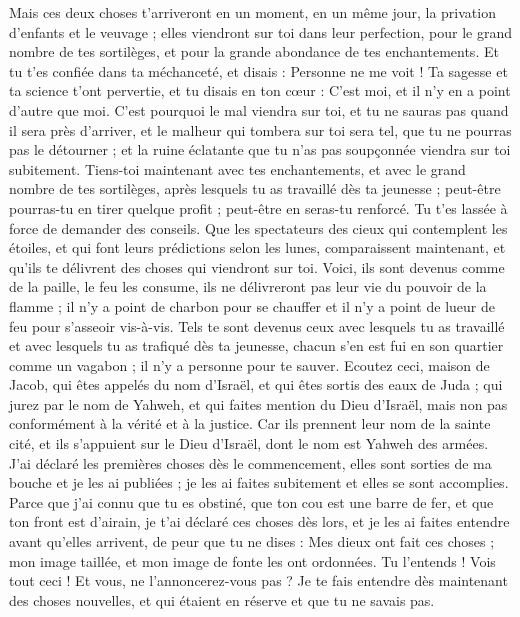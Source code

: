 \begin{multicols}{2}
Mais ces deux choses t'arriveront en un moment, en un même jour, la privation d'enfants et le veuvage ; elles viendront sur toi dans leur perfection, pour le  grand nombre de tes sortilèges, et pour la grande abondance de tes enchantements.
Et tu t'es confiée dans ta méchanceté, et disais : Personne ne me voit ! Ta sagesse et ta science t'ont pervertie, et tu disais en ton cœur : C'est moi, et il n'y en a point d'autre que moi.
 C'est pourquoi le mal viendra sur toi, et tu ne sauras pas quand il sera près d'arriver, et le malheur qui tombera sur toi sera tel, que tu ne pourras pas le détourner ; et la ruine éclatante que tu n'as pas soupçonnée viendra sur toi subitement.
Tiens-toi maintenant avec tes enchantements, et avec le grand nombre de tes sortilèges, après lesquels tu as travaillé dès ta jeunesse ; peut-être pourras-tu en tirer quelque profit ; peut-être en seras-tu renforcé.
Tu t'es lassée à force de demander des conseils. Que les spectateurs des cieux qui contemplent les étoiles, et qui font leurs prédictions selon les lunes, comparaissent maintenant, et qu'ils te délivrent des choses qui viendront sur toi.
Voici, ils sont devenus comme de la paille, le feu les consume, ils ne délivreront pas leur vie du pouvoir de la flamme ; il n'y a point de charbon pour se chauffer et il n'y a point de lueur de feu pour s'asseoir vis-à-vis. 
Tels te sont devenus ceux avec lesquels tu as travaillé et avec lesquels tu as trafiqué dès ta jeunesse, chacun s'en est fui en son quartier comme un vagabon ; il n'y a personne pour te sauver.
\VerseOne{}Ecoutez ceci, maison de Jacob, qui êtes appelés du nom d'Israël, et qui êtes sortis des eaux de Juda ; qui jurez par le nom de Yahweh, et qui faites mention du Dieu d'Israël, mais non pas conformément à la vérité et à la justice.
Car ils prennent leur nom de la sainte cité, et ils s'appuient sur le Dieu d'Israël, dont le nom est Yahweh des armées.
J'ai déclaré les premières choses dès le commencement, elles sont sorties de ma bouche et je les ai publiées ; je les ai faites subitement et elles se sont accomplies.
Parce que j'ai connu que tu es obstiné, que ton cou est une barre de fer, et que ton front est d'airain,
je t'ai déclaré ces choses dès lors, et je les ai faites entendre avant qu'elles arrivent, de peur que tu ne dises : Mes dieux ont fait ces choses ; mon image taillée, et mon image de fonte les ont ordonnées.
Tu l'entends ! Vois tout ceci ! Et vous, ne l'annoncerez-vous pas ? Je te fais entendre dès maintenant des choses nouvelles, et qui étaient en réserve et que tu ne savais pas.

\end{multicols}
